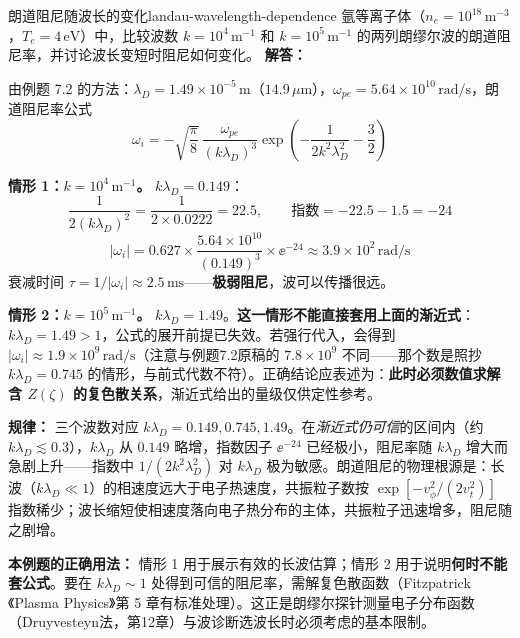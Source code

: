 \begin{example}{朗道阻尼随波长的变化}{landau-wavelength-dependence}
氩等离子体（$n_e=10^{18}\,\mathrm{m^{-3}}$，$T_e=4\,\mathrm{eV}$）中，比较波数 $k = 10^4\,\mathrm{m^{-1}}$ 和 $k = 10^5\,\mathrm{m^{-1}}$ 的两列朗缪尔波的朗道阻尼率，并讨论波长变短时阻尼如何变化。
\tcblower
\textbf{解答：}

由例题 7.2 的方法：$\lambda_D = 1.49\times10^{-5}\,\mathrm{m}$（$14.9\,\mu\mathrm{m}$），$\omega_{pe} = 5.64\times10^{10}\,\mathrm{rad/s}$，朗道阻尼率公式
\[
\omega_i = -\sqrt{\frac{\pi}{8}}\,\frac{\omega_{pe}}{(k\lambda_D)^3}\exp\!\left(-\frac{1}{2k^2\lambda_D^2}-\frac{3}{2}\right)
\]

\textbf{情形 1：$k = 10^4\,\mathrm{m^{-1}}$。} $k\lambda_D = 0.149$：
\[
\frac{1}{2(k\lambda_D)^2} = \frac{1}{2\times0.0222} = 22.5,\qquad \text{指数} = -22.5-1.5 = -24
\]
\[
|\omega_i| = 0.627\times\frac{5.64\times10^{10}}{(0.149)^3}\times\ee^{-24} \approx 3.9\times10^{2}\,\mathrm{rad/s}
\]
衰减时间 $\tau = 1/|\omega_i| \approx 2.5\,\mathrm{ms}$——\textbf{极弱阻尼}，波可以传播很远。

\textbf{情形 2：$k = 10^5\,\mathrm{m^{-1}}$。} $k\lambda_D = 1.49$。\textbf{这一情形不能直接套用上面的渐近式}：$k\lambda_D=1.49>1$，公式的展开前提已失效。若强行代入，会得到 $|\omega_i|\approx1.9\times10^{9}\,\mathrm{rad/s}$（注意与例题7.2原稿的 $7.8\times10^{9}$ 不同——那个数是照抄 $k\lambda_D=0.745$ 的情形，与前式代数不符）。正确结论应表述为：\textbf{此时必须数值求解含 $Z(\zeta)$ 的复色散关系}，渐近式给出的量级仅供定性参考。

\textbf{规律：} 三个波数对应 $k\lambda_D = 0.149,0.745,1.49$。在\emph{渐近式仍可信}的区间内（约 $k\lambda_D\lesssim0.3$），$k\lambda_D$ 从 $0.149$ 略增，指数因子 $\ee^{-24}$ 已经极小，阻尼率随 $k\lambda_D$ 增大而急剧上升——指数中 $1/(2k^2\lambda_D^2)$ 对 $k\lambda_D$ 极为敏感。朗道阻尼的物理根源是：长波（$k\lambda_D\ll1$）的相速度远大于电子热速度，共振粒子数按 $\exp[-v_\phi^2/(2v_t^2)]$ 指数稀少；波长缩短使相速度落向电子热分布的主体，共振粒子迅速增多，阻尼随之剧增。

\textbf{本例题的正确用法：} 情形 1 用于展示有效的长波估算；情形 2 用于说明\textbf{何时不能套公式}。要在 $k\lambda_D\sim1$ 处得到可信的阻尼率，需解复色散函数（Fitzpatrick《Plasma Physics》第 5 章有标准处理）。这正是朗缪尔探针测量电子分布函数（Druyvesteyn法，第12章）与波诊断选波长时必须考虑的基本限制。
\end{example}

